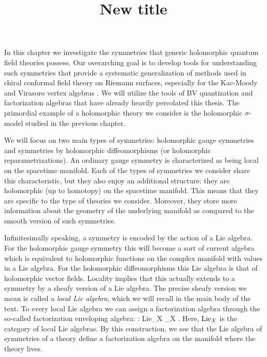 \documentclass[10pt]{amsart}
\title{New title}
\begin{document}
\maketitle
\tableofcontents


In this chapter we investigate the symmetries that generic holomorphic quantum field theories possess.
Our overarching goal is to develop tools for understanding such symmetries that provide a systematic generalization of methods used in chiral conformal field theory on Riemann surfaces, especially for the Kac-Moody and Virasoro vertex algebras \cite{IgorKM, KacVertex, BorcherdsVertex}. 
We will utilize the tools of BV quantization and factorization algebras that have already heavily percolated this thesis.
The primordial example of a holomorphic theory we consider is the holomorphic $\sigma$-model studied in the previous chapter. 

We will focus on two main types of symmetries: holomorphic gauge symmetries and symmetries by holomorphic diffeomorphisms (or holomorphic reparametrizations). 
An ordinary gauge symmetry is characterized as being local on the spacetime manifold. 
Each of the types of symmetries we consider share this characteristic, but they also enjoy an additional structure: they are holomorphic (up to homotopy) on the spacetime manifold. 
This means that they are specific to the type of theories we consider.
Moreover, they store more information about the geometry of the underlying manifold as compared to the smooth version of such symmetries.

Infinitesimally speaking, a symmetry is encoded by the action of a Lie algebra.
For the holomorphic gauge symmetry this will become a sort of current algebra which is equivalent to holomorphic functions on the complex manifold with values in a Lie algebra.
For the holomorphic diffeomorphisms this Lie algebra is that of holomorphic vector fields.
Locality implies that this actually extends to a symmetry by a sheafy version of a Lie algebra. 
The precise sheafy version we mean is called a {\em local Lie algebra}, which we will recall in the main body of the text. 
To every local Lie algebra we can assign a factorization algebra through the so-called factorization enveloping algebra:
\ben
{} : {\rm Lie}_X _X .
\een
Here, ${\rm Lie}_X$ is the category of local Lie algebras.
By this construction, we see that the Lie algebra of symmetries of a theory define a factorization algebra on the manifold where the theory lives. 
\end{document}
